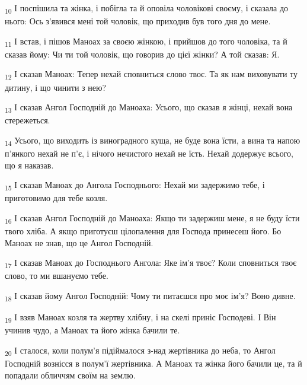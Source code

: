 \begin{tcolorbox}
\textsubscript{10} І поспішила та жінка, і побігла та й оповіла чоловікові своєму, і сказала до нього: Ось з'явився мені той чоловік, що приходив був того дня до мене.
\end{tcolorbox}
\begin{tcolorbox}
\textsubscript{11} І встав, і пішов Маноах за своєю жінкою, і прийшов до того чоловіка, та й сказав йому: Чи ти той чоловік, що говорив до цієї жінки? А той сказав: Я.
\end{tcolorbox}
\begin{tcolorbox}
\textsubscript{12} І сказав Маноах: Тепер нехай сповниться слово твоє. Та як нам виховувати ту дитину, і що чинити з нею?
\end{tcolorbox}
\begin{tcolorbox}
\textsubscript{13} І сказав Ангол Господній до Маноаха: Усього, що сказав я жінці, нехай вона стережеться.
\end{tcolorbox}
\begin{tcolorbox}
\textsubscript{14} Усього, що виходить із виноградного куща, не буде вона їсти, а вина та напою п'янкого нехай не п'є, і нічого нечистого нехай не їсть. Нехай додержує всього, що я наказав.
\end{tcolorbox}
\begin{tcolorbox}
\textsubscript{15} І сказав Маноах до Ангола Господнього: Нехай ми задержимо тебе, і приготовимо для тебе козля.
\end{tcolorbox}
\begin{tcolorbox}
\textsubscript{16} І сказав Ангол Господній до Маноаха: Якщо ти задержиш мене, я не буду їсти твого хліба. А якщо приготуєш цілопалення для Господа принесеш його. Бо Маноах не знав, що це Ангол Господній.
\end{tcolorbox}
\begin{tcolorbox}
\textsubscript{17} І сказав Маноах до Господнього Ангола: Яке ім'я твоє? Коли сповниться твоє слово, то ми вшануємо тебе.
\end{tcolorbox}
\begin{tcolorbox}
\textsubscript{18} І сказав йому Ангол Господній: Чому ти питаєшся про моє ім'я? Воно дивне.
\end{tcolorbox}
\begin{tcolorbox}
\textsubscript{19} І взяв Маноах козля та жертву хлібну, і на скелі приніс Господеві. І Він учинив чудо, а Маноах та його жінка бачили те.
\end{tcolorbox}
\begin{tcolorbox}
\textsubscript{20} І сталося, коли полум'я підіймалося з-над жертівника до неба, то Ангол Господній вознісся в полум'ї жертівника. А Маноах та жінка його бачили це, та й попадали обличчям своїм на землю.
\end{tcolorbox}

